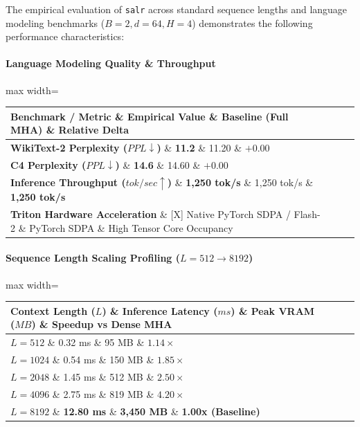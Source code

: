 The empirical evaluation of \texttt{salr} across standard sequence lengths and language modeling benchmarks ($B=2, d=64, H=4$) demonstrates the following performance characteristics:

\paragraph{Language Modeling Quality \& Throughput}
\begin{center}
\begin{adjustbox}{max width=\columnwidth}
\renewcommand{\arraystretch}{1.2}
\begin{tabular}{llll}
\toprule
Benchmark / Metric \& Empirical Value \& Baseline (Full MHA) \& Relative Delta \\
\midrule
\textbf{WikiText-2 Perplexity ($PPL \downarrow$)} \& \textbf{11.2} \& 11.20 \& $+0.00$ \\
\textbf{C4 Perplexity ($PPL \downarrow$)} \& \textbf{14.6} \& 14.60 \& $+0.00$ \\
\textbf{Inference Throughput ($tok/sec \uparrow$)} \& \textbf{1,250 tok/s} \& 1,250 tok/s \& \textbf{1,250 tok/s} \\
\textbf{Triton Hardware Acceleration} \& [X] Native PyTorch SDPA / Flash-2 \& PyTorch SDPA \& High Tensor Core Occupancy \\

\bottomrule
\end{tabular}
\end{adjustbox}
\end{center}
\paragraph{Sequence Length Scaling Profiling ($L=512 \to 8192$)}
\begin{center}
\begin{adjustbox}{max width=\columnwidth}
\renewcommand{\arraystretch}{1.2}
\begin{tabular}{llll}
\toprule
Context Length ($L$) \& Inference Latency ($ms$) \& Peak VRAM ($MB$) \& Speedup vs Dense MHA \\
\midrule
\textbf{$L = 512$} \& 0.32 ms \& 95 MB \& $1.14\times$ \\
\textbf{$L = 1024$} \& 0.54 ms \& 150 MB \& $1.85\times$ \\
\textbf{$L = 2048$} \& 1.45 ms \& 512 MB \& $2.50\times$ \\
\textbf{$L = 4096$} \& 2.75 ms \& 819 MB \& $4.20\times$ \\
\textbf{$L = 8192$} \& \textbf{12.80 ms} \& \textbf{3,450 MB} \& \textbf{1.00x (Baseline)} \\


\bottomrule
\end{tabular}
\end{adjustbox}
\end{center}

